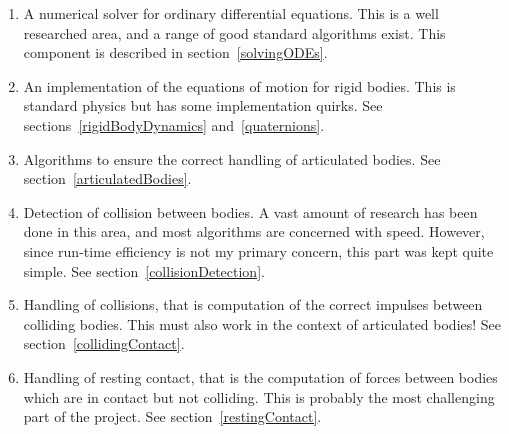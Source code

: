\begin{enumerate}
\item A numerical solver for ordinary differential equations. This is a well researched area, and
    a range of good standard algorithms exist. This component is described in
    section~\ref{solvingODEs}.
\item An implementation of the equations of motion for rigid bodies. This is standard physics but
    has some implementation quirks. See sections~\ref{rigidBodyDynamics} and~\ref{quaternions}.
\item Algorithms to ensure the correct handling of articulated bodies.
    See section~\ref{articulatedBodies}.
\item Detection of collision between bodies. A vast amount of research has been done in this area,
    and most algorithms are concerned with speed. However, since run-time efficiency is not my
    primary concern, this part was kept quite simple. See section~\ref{collisionDetection}.
\item Handling of collisions, that is computation of the correct impulses between colliding
    bodies. This must also work in the context of articulated bodies!
    See section~\ref{collidingContact}.
\item Handling of resting contact, that is the computation of forces between bodies which are in
    contact but not colliding. This is probably the most challenging part of the project.
    See section~\ref{restingContact}.
\end{enumerate}
